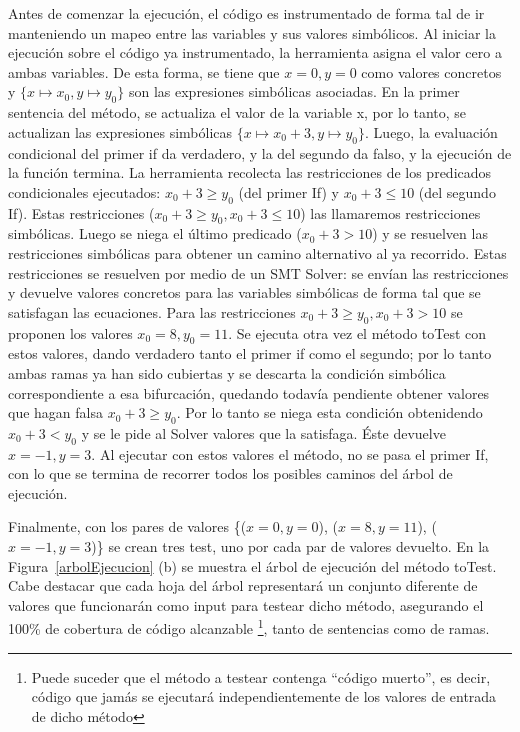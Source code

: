 \documentclass{llncs}
\begin{document}
Antes de comenzar la ejecución, el código es instrumentado de forma tal de ir manteniendo un mapeo entre las variables y sus valores simbólicos. Al iniciar la ejecución sobre el
código ya instrumentado, la herramienta asigna el valor cero a ambas variables. De esta forma, se tiene que $x=0, y=0$ como valores concretos y \(\{x\mapsto x_0,y\mapsto y_0\}\)
son las expresiones simbólicas asociadas. En la primer sentencia del método, se actualiza el valor de la variable x, por lo tanto, se actualizan las expresiones simbólicas
\(\{x\mapsto x_0+3,y\mapsto y_0\}\). Luego, la evaluación condicional del primer if da verdadero, y la del segundo da falso, y la ejecución de la función termina.
La herramienta recolecta las restricciones de los predicados condicionales ejecutados: $x_0+3 \geq y_0$ (del primer If) y $x_0+3 \leq 10$ (del segundo If).
Estas restricciones ($x_0+3 \geq y_0, x_0+3 \leq 10$) las llamaremos restricciones simbólicas. Luego se niega el último predicado ($x_0+3 > 10$) y se resuelven las restricciones
simbólicas para obtener un camino alternativo al ya recorrido. Estas restricciones se resuelven por medio de un SMT Solver: se envían las restricciones y devuelve valores
concretos para las variables simbólicas de forma tal que se satisfagan las ecuaciones. Para las restricciones $x_0+3 \geq y_0, x_0+3 > 10$ se proponen los valores $x_0 = 8, y_0 = 11$.
Se ejecuta otra vez el método toTest con estos valores, dando verdadero tanto el primer if como el segundo; por lo tanto ambas ramas ya han sido cubiertas y se descarta la condición
simbólica correspondiente a esa bifurcación, quedando todavía pendiente obtener valores que hagan falsa $x_0+3 \geq y_0$. Por lo tanto se niega esta condición obtenidendo
$x_0+3 < y_0$ y se le pide al Solver valores que la satisfaga. Éste devuelve $x=-1, y=3$. Al ejecutar con estos valores el método, no se pasa el primer If, con lo que se termina de recorrer todos los posibles caminos del árbol de ejecución.

Finalmente, con los pares de valores \{($x=0,y=0$), ($x=8,y=11$), ($x=-1,y=3$)\} se crean tres test, uno por cada par de valores devuelto. En la Figura~\ref{arbolEjecucion} (b) se muestra el árbol
de ejecución del método toTest. Cabe destacar que cada hoja del árbol representará un conjunto diferente de valores que funcionarán como input para testear dicho método,
asegurando el 100\% de cobertura de código alcanzable \footnote{Puede suceder que el método a testear contenga “código muerto”, es decir, código que jamás se ejecutará
independientemente de los valores de entrada de dicho método}, tanto de sentencias como de ramas. 
\end{document}
